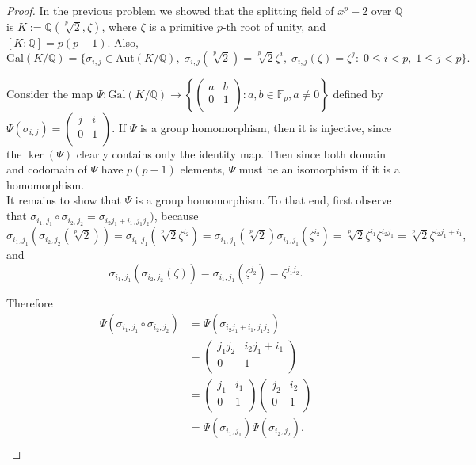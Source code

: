 \documentclass{article}
\begin{document}
  \begin{proof}
    In the previous problem we showed that the splitting field of $x^p-2$
    over $\mathbb{Q}$ is $K:=\mathbb{Q}(\sqrt[p]{2},\zeta)$, where
    $\zeta$ is a primitive $p$-th root of unity, and
    $[K:\mathbb{Q}]=p(p-1)$. Also,
    \[\text{Gal}(K/\mathbb{Q}) =\{\sigma_{i,j}\in\text{Aut}(K/\mathbb{Q}),\;
    \sigma_{i,j}(\sqrt[p]{2})=\sqrt[p]{2}\zeta^i,\;
    \sigma_{i,j}(\zeta)=\zeta^j:\; 0\leq i<p,\; 1\leq j<p\}.\]

    Consider the map $\Psi:\text{Gal}(K/\mathbb{Q}) \rightarrow \left\{
    \begin{pmatrix} a&b\\ 0&1\\ \end{pmatrix}: a,b\in\mathbb{F}_p, a\neq0
    \right\}$ defined by $\Psi(\sigma_{i,j}) =\begin{pmatrix} j&i\\ 0&1\\
    \end{pmatrix}$. If $\Psi$ is a group homomorphism, then it is
    injective, since the $\ker(\Psi)$ clearly contains only the identity
    map. Then since both domain and codomain of $\Psi$ have $p(p-1)$
    elements, $\Psi$ must be an isomorphism if it is a homomorphism. \\

    It remains to show that $\Psi$ is a group homomorphism. To that end,
    first observe that
    $\sigma_{i_1,j_1}\circ\sigma_{i_2,j_2} =\sigma_{i_2j_1+i_1,j_1j_2})$,
    because
    \[\sigma_{i_1,j_1} (\sigma_{i_2,j_2}(\sqrt[p]{2}))
    =\sigma_{i_1,j_1}(\sqrt[p]{2}\zeta^{i_2})
    =\sigma_{i_1,j_1}(\sqrt[p]{2}) \sigma_{i_1,j_1}(\zeta^{i_2})
    =\sqrt[p]{2}\zeta^{i_1}\zeta^{i_2j_1}
    =\sqrt[p]{2}\zeta^{i_2j_1+i_1},\]
    and
    \[\sigma_{i_1,j_1} (\sigma_{i_2,j_2}(\zeta))
    =\sigma_{i_1,j_1}(\zeta^{j_2})
    =\zeta^{j_1j_2}.\]

    Therefore
    \begin{align*}
      \Psi(\sigma_{i_1,j_1}\circ\sigma_{i_2,j_2})
        &=\Psi(\sigma_{i_2j_1+i_1,j_1j_2})\\
      &=\begin{pmatrix} j_1j_2 &i_2j_1+i_1\\ 0&1\\ \end{pmatrix} \\
      &=\begin{pmatrix} j_1 &i_1\\ 0&1\\ \end{pmatrix} \begin{pmatrix} j_2
        &i_2\\ 0&1\\ \end{pmatrix}\\
      &=\Psi(\sigma_{i_1,j_1}) \Psi(\sigma_{i_2,j_2}).\\
    \end{align*}
  \end{proof}
\end{document}

